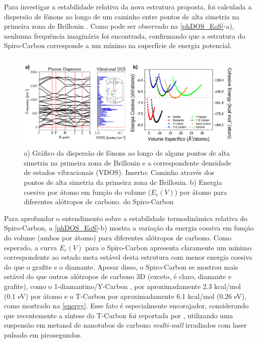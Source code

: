 	Para investigar a estabilidade relativa da nova estrutura proposta, foi calculada a dispersão de fônons ao longo de um caminho entre pontos de alta simetria na primeira zona de Brillouin \cite{bradley2010mathematical}. Como pode ser observado na \autoref{phDOS_EoS}-a), nenhuma frequência imaginária foi encontrada, confirmando que a estrutura do Spiro-Carbon corresponde a um mínimo na superfície de energia potencial. 
	
	\begin{figure}[ht]
		\centering
		\includegraphics[width=1\linewidth]{capitulos/fig/phDOS_EoS}
		\caption{a) Gráfico da dispersão de fônons ao longo de alguns pontos de alta simetria na primeira zona de Brillouin e a correspondente densidade de estados vibracionais (VDOS). Inserto: Caminho através dos pontos de alta simetria da primeira zona de Brillouin. b) Energia coesiva por átomo em função do volume ($E_c(V)$) por átomo para diferentes alótropos de carbono. do Spiro-Carbon}
		\label{phDOS_EoS}
	\end{figure}

	Para aprofundar o entendimento sobre a estabilidade termodinâmica relativa do Spiro-Carbon, a \autoref{phDOS_EoS}-b) mostra a variação da energia coesiva em função do volume (ambos por átomo) para diferentes alótropos de carbono. Como esperado, a curva $E_c(V)$ para o Spiro-Carbon apresenta claramente um mínimo correspondente ao estado meta estável desta estrutura com menor energia coesiva do que o grafite e o diamante. Apesar disso, o Spiro-Carbon se mostrou mais estável do que outros alótropos de carbono 3D (exceto, é claro, diamante e grafite), como o 1-diamantino/Y-Carbon \cite{costa2018n,li2014modulated}, por aproximadamente 2.3 kcal/mol (0.1 eV) por átomo e o T-Carbon \cite{sheng2011t} por aproximadamente 6.1 kcal/mol (0.26 eV), como mostrado na \autoref{energy}. Esse fato é especialmente encorajador, considerando que recentemente a síntese do T-Carbon foi reportada por \citeauthor{zhang2017pseudo}, utilizando uma suspensão em metanol de nanotubos de carbono \textit{multi-wall} irradiados com laser pulsado em picosegundos.
	
